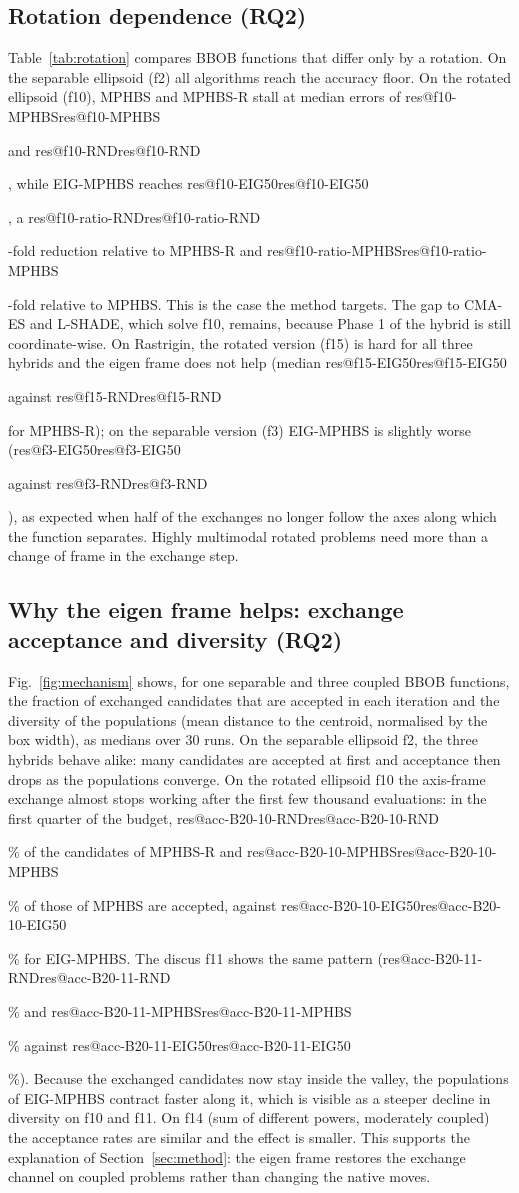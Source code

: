 \documentclass[preprint,12pt,authoryear]{elsarticle}
\makeatletter
\theoremstyle{remark}
\def\res#1{\ifcsname res@#1\endcsname\csname res@#1\endcsname\else\PackageError{res}{Undefined result key #1}{}\fi}
\makeatother
\begin{document}
\subsection{Rotation dependence (RQ2)}
\label{sec:rotation}
Table~\ref{tab:rotation} compares BBOB functions that differ only by a rotation. On the separable ellipsoid (f2) all
algorithms reach the accuracy floor. On the rotated ellipsoid (f10), MPHBS and MPHBS-R stall at median errors of
\res{f10-MPHBS} and \res{f10-RND}, while EIG-MPHBS reaches \res{f10-EIG50}, a \res{f10-ratio-RND}-fold reduction
relative to MPHBS-R and \res{f10-ratio-MPHBS}-fold relative to MPHBS. This is the case the method targets. The gap to
CMA-ES and L-SHADE, which solve f10, remains, because Phase 1 of the hybrid is still coordinate-wise. On Rastrigin, the
rotated version (f15) is hard for all three hybrids and the eigen frame does not help (median \res{f15-EIG50} against
\res{f15-RND} for MPHBS-R); on the separable version (f3) EIG-MPHBS is slightly worse (\res{f3-EIG50} against
\res{f3-RND}), as expected when half of the exchanges no longer follow the axes along which the function separates.
Highly multimodal rotated problems need more than a change of frame in the exchange step.



\subsection{Why the eigen frame helps: exchange acceptance and diversity (RQ2)}
\label{sec:mechanism}
Fig.~\ref{fig:mechanism} shows, for one separable and three coupled BBOB functions, the fraction of exchanged
candidates that are accepted in each iteration and the diversity of the populations (mean distance to the centroid,
normalised by the box width), as medians over 30 runs. On the separable ellipsoid f2, the three hybrids behave alike:
many candidates are accepted at first and acceptance then drops as the populations converge. On the rotated ellipsoid
f10 the axis-frame exchange almost stops working after the first few thousand evaluations: in the first quarter of the
budget, \res{acc-B20-10-RND}\% of the candidates of MPHBS-R and \res{acc-B20-10-MPHBS}\% of those of MPHBS are accepted,
against \res{acc-B20-10-EIG50}\% for EIG-MPHBS. The discus f11 shows the same pattern (\res{acc-B20-11-RND}\% and
\res{acc-B20-11-MPHBS}\% against \res{acc-B20-11-EIG50}\%). Because the exchanged candidates now stay inside the
valley, the populations of EIG-MPHBS contract faster along it, which is visible as a steeper decline in diversity on f10
and f11. On f14 (sum of different powers, moderately coupled) the acceptance rates are similar and the effect is
smaller. This supports the explanation of Section~\ref{sec:method}: the eigen frame restores the exchange channel on
coupled problems rather than changing the native moves.
\end{document}
